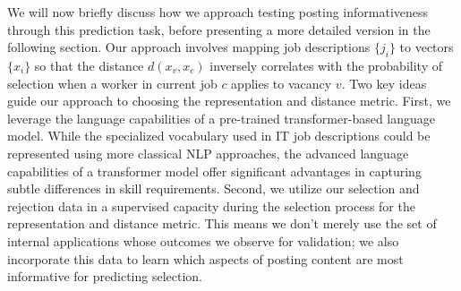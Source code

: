 We will now briefly discuss how we approach testing posting informativeness through this prediction task, before presenting a more detailed version in the following section. Our approach involves mapping job descriptions \(\{j_i\}\) to vectors \(\{x_i\}\) so that the distance \(d(x_v, x_c)\) inversely correlates with the probability of selection when a worker in current job \(c\) applies to vacancy \(v\). Two key ideas guide our approach to choosing the representation and distance metric. First, we leverage the language capabilities of a pre-trained transformer-based language model. While the specialized vocabulary used in IT job descriptions could be represented using more classical NLP approaches, the advanced language capabilities of a transformer model offer significant advantages in capturing subtle differences in skill requirements. Second, we utilize our selection and rejection data in a supervised capacity during the selection process for the representation and distance metric. This means we don't merely use the set of internal applications whose outcomes we observe for validation; we also incorporate this data to learn which aspects of posting content are most informative for predicting selection.


